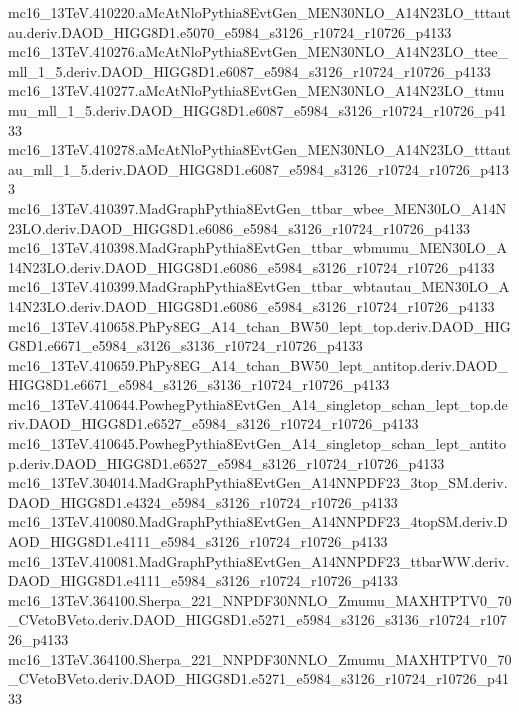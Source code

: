 mc16_13TeV.410220.aMcAtNloPythia8EvtGen_MEN30NLO_A14N23LO_tttautau.deriv.DAOD_HIGG8D1.e5070_e5984_s3126_r10724_r10726_p4133 \\
mc16_13TeV.410276.aMcAtNloPythia8EvtGen_MEN30NLO_A14N23LO_ttee_mll_1_5.deriv.DAOD_HIGG8D1.e6087_e5984_s3126_r10724_r10726_p4133 \\
mc16_13TeV.410277.aMcAtNloPythia8EvtGen_MEN30NLO_A14N23LO_ttmumu_mll_1_5.deriv.DAOD_HIGG8D1.e6087_e5984_s3126_r10724_r10726_p4133 \\
mc16_13TeV.410278.aMcAtNloPythia8EvtGen_MEN30NLO_A14N23LO_tttautau_mll_1_5.deriv.DAOD_HIGG8D1.e6087_e5984_s3126_r10724_r10726_p4133 \\
mc16_13TeV.410397.MadGraphPythia8EvtGen_ttbar_wbee_MEN30LO_A14N23LO.deriv.DAOD_HIGG8D1.e6086_e5984_s3126_r10724_r10726_p4133 \\
mc16_13TeV.410398.MadGraphPythia8EvtGen_ttbar_wbmumu_MEN30LO_A14N23LO.deriv.DAOD_HIGG8D1.e6086_e5984_s3126_r10724_r10726_p4133 \\
mc16_13TeV.410399.MadGraphPythia8EvtGen_ttbar_wbtautau_MEN30LO_A14N23LO.deriv.DAOD_HIGG8D1.e6086_e5984_s3126_r10724_r10726_p4133 \\
mc16_13TeV.410658.PhPy8EG_A14_tchan_BW50_lept_top.deriv.DAOD_HIGG8D1.e6671_e5984_s3126_s3136_r10724_r10726_p4133 \\
mc16_13TeV.410659.PhPy8EG_A14_tchan_BW50_lept_antitop.deriv.DAOD_HIGG8D1.e6671_e5984_s3126_s3136_r10724_r10726_p4133 \\
mc16_13TeV.410644.PowhegPythia8EvtGen_A14_singletop_schan_lept_top.deriv.DAOD_HIGG8D1.e6527_e5984_s3126_r10724_r10726_p4133 \\
mc16_13TeV.410645.PowhegPythia8EvtGen_A14_singletop_schan_lept_antitop.deriv.DAOD_HIGG8D1.e6527_e5984_s3126_r10724_r10726_p4133 \\
mc16_13TeV.304014.MadGraphPythia8EvtGen_A14NNPDF23_3top_SM.deriv.DAOD_HIGG8D1.e4324_e5984_s3126_r10724_r10726_p4133 \\
mc16_13TeV.410080.MadGraphPythia8EvtGen_A14NNPDF23_4topSM.deriv.DAOD_HIGG8D1.e4111_e5984_s3126_r10724_r10726_p4133 \\
mc16_13TeV.410081.MadGraphPythia8EvtGen_A14NNPDF23_ttbarWW.deriv.DAOD_HIGG8D1.e4111_e5984_s3126_r10724_r10726_p4133 \\
mc16_13TeV.364100.Sherpa_221_NNPDF30NNLO_Zmumu_MAXHTPTV0_70_CVetoBVeto.deriv.DAOD_HIGG8D1.e5271_e5984_s3126_s3136_r10724_r10726_p4133 \\
mc16_13TeV.364100.Sherpa_221_NNPDF30NNLO_Zmumu_MAXHTPTV0_70_CVetoBVeto.deriv.DAOD_HIGG8D1.e5271_e5984_s3126_r10724_r10726_p4133 \\

